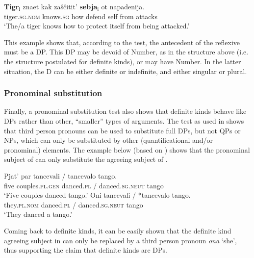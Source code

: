 \documentclass[output=paper
,modfonts
,nonflat]{langsci/langscibook}
\begin{document}
	\ea\label{ex:borik:19}
	\gll \textbf{Tigr}\textnormal{$_\text{i}$} znaet 	kak za\v{s}\v{c}itit' 	\textbf{sebja}\textnormal{$_\text{i}$} ot napadenija.\\
	tiger.\textsc{sg.nom} knows.\textsc{sg} how defend self from attacks\\
	\glt `The/a tiger knows how to protect itself from being attacked.'
	\z
	
	This example shows that, according to the test, the antecedent of the reflexive must be a DP. This DP may be devoid of Number, as in the structure  above (i.e. the structure postulated for definite kinds), or may have Number. In the latter situation, the D can be either definite or indefinite, and either singular or plural. 
	
	\subsubsection{Pronominal substitution}
	
	Finally, a pronominal substitution test also shows that definite kinds behave like DPs rather than other, ``smaller'' types of arguments. The test as used in \citet{Pereltsvaig2006} shows that third person pronouns can be used to substitute full DPs, but not QPs or NPs, which can only be substituted by other (quantificational and/or pronominal) elements. The example below (based on \citealt[446, ex. 15a]{Pereltsvaig2006}) shows that the pronominal subject of  can only substitute the agreeing subject of . 
	
	\ea\label{ex:borik:20}
	\ea\label{ex:borik:20a}
	\gll Pjat' par tancevali \textnormal{/} tancevalo tango.\\
	five 	couples.\textsc{pl.gen} danced.\textsc{pl} \textnormal{/} danced.\textsc{sg.neut} 	tango\\
	\glt `Five couples danced tango.'
	\ex\label{ex:borik:20b}
	\gll Oni tancevali \textnormal{/} \textnormal{*}tancevalo tango.\\
	they.\textsc{pl.nom} danced.\textsc{pl} \textnormal{/} \phantom{*}danced.\textsc{sg.neut} 	tango\\
	\glt `They danced a tango.'
	\z
	\z
	
	Coming back to definite kinds, it can be easily shown that the definite kind agreeing subject in  can only be replaced by a third person pronoun \textit{ona} `she', thus supporting the claim that definite kinds are DPs.
	
\end{document}

